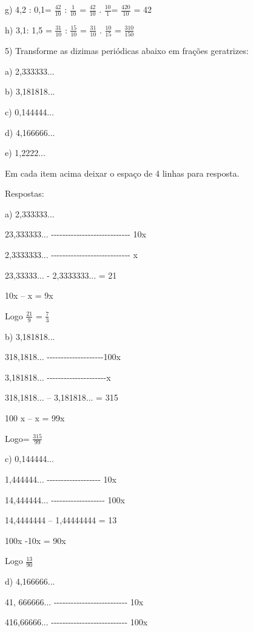 {g) 4,2 : 0,1= \(\frac{42}{10}\) : \(\frac{1}{10}\) = \(\frac{42}{10}\) .
\(\frac{10}{1}\)= \(\frac{420}{10}\) = 42

h) 3,1: 1,5 = \(\frac{31}{10}\) : \(\frac{15}{10}\) = \(\frac{31}{10}\)
. \(\frac{10}{15}\) = \(\frac{310}{150}\)

5) Transforme as dizimas periódicas abaixo em frações geratrizes:

a) 2,333333...

b) 3,181818...

c) 0,144444...

d) 4,166666...

e) 1,2222...

Em cada item acima deixar o espaço de 4 linhas para resposta.

Respostas:

a) 2,333333...

23,333333...
-\/-\/-\/-\/-\/-\/-\/-\/-\/-\/-\/-\/-\/-\/-\/-\/-\/-\/-\/-\/-\/-\/-\/-\/-\/-\/-\/-
10x

2,3333333...
-\/-\/-\/-\/-\/-\/-\/-\/-\/-\/-\/-\/-\/-\/-\/-\/-\/-\/-\/-\/-\/-\/-\/-\/-\/-\/-\/-
x

23,33333... - 2,3333333... = 21

10x -- x = 9x

Logo \(\frac{21}{9}\) = \(\frac{7}{3}\)

b) 3,181818...

318,1818...
-\/-\/-\/-\/-\/-\/-\/-\/-\/-\/-\/-\/-\/-\/-\/-\/-\/-\/-\/-100x

3,181818...
-\/-\/-\/-\/-\/-\/-\/-\/-\/-\/-\/-\/-\/-\/-\/-\/-\/-\/-\/-\/-x

318,1818... -- 3,181818... = 315

100 x -- x = 99x

Logo= \(\frac{315}{99}\)

c) 0,144444...

1,444444... -\/-\/-\/-\/-\/-\/-\/-\/-\/-\/-\/-\/-\/-\/-\/-\/-\/-\/- 10x

14,444444... -\/-\/-\/-\/-\/-\/-\/-\/-\/-\/-\/-\/-\/-\/-\/-\/-\/-\/-
100x

14,4444444 -- 1,44444444 = 13

100x -10x = 90x

Logo \(\frac{13}{90}\)

d) 4,166666...

41, 666666...
-\/-\/-\/-\/-\/-\/-\/-\/-\/-\/-\/-\/-\/-\/-\/-\/-\/-\/-\/-\/-\/-\/-\/-\/-\/-
10x

416,66666...
-\/-\/-\/-\/-\/-\/-\/-\/-\/-\/-\/-\/-\/-\/-\/-\/-\/-\/-\/-\/-\/-\/-\/-\/-\/-\/-
100x

}
